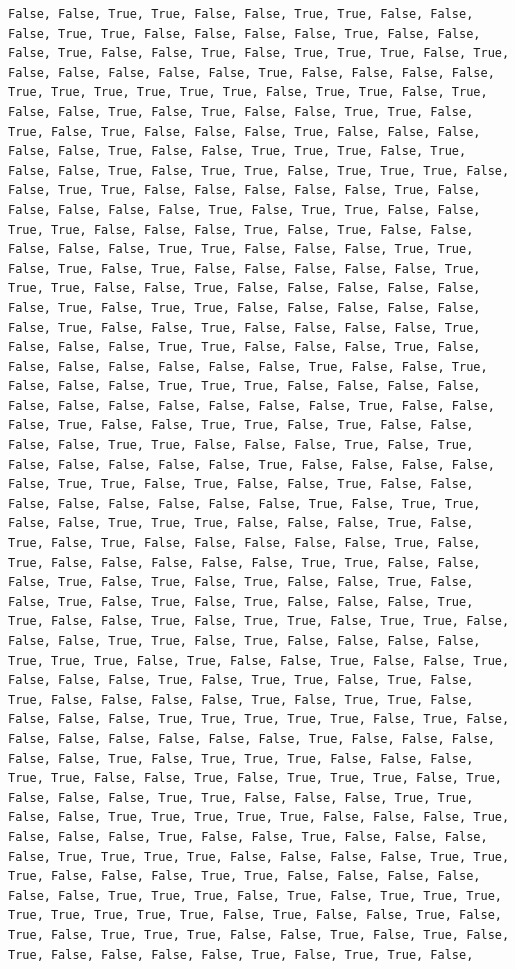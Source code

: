 \documentclass[
  letterpaper,
  DIV=11,
  numbers=noendperiod]{scrartcl}
\begin{document}
\begin{verbatim}
False, False, True, True, False, False, True, True, False, False, False, True, True, False, False, False, False, True, False, False, False, True, False, False, True, False, True, True, True, False, True, False, False, False, False, False, True, False, False, False, False, True, True, True, True, True, True, False, True, True, False, True, False, False, True, False, True, False, False, True, True, False, True, False, True, False, False, False, True, False, False, False, False, False, True, False, False, True, True, True, False, True, False, False, True, False, True, True, False, True, True, True, False, False, True, True, False, False, False, False, False, True, False, False, False, False, False, True, False, True, True, False, False, True, True, False, False, False, True, False, True, False, False, False, False, False, True, True, False, False, False, True, True, False, True, False, True, False, False, False, False, False, True, True, True, False, False, True, False, False, False, False, False, False, True, False, True, True, False, False, False, False, False, False, True, False, False, True, False, False, False, False, True, False, False, False, True, True, False, False, False, True, False, False, False, False, False, False, False, True, False, False, True, False, False, False, True, True, True, False, False, False, False, False, False, False, False, False, False, False, True, False, False, False, True, False, False, True, True, False, True, False, False, False, False, True, True, False, False, False, True, False, True, False, False, False, False, False, True, False, False, False, False, False, True, True, False, True, False, False, True, False, False, False, False, False, False, False, False, True, False, True, True, False, False, True, True, True, False, False, False, True, False, True, False, True, False, False, False, False, False, True, False, True, False, False, False, False, False, True, True, False, False, False, True, False, True, False, True, False, False, True, False, False, True, False, True, False, True, False, False, False, True, True, False, False, True, False, True, True, False, True, True, False, False, False, True, True, False, True, False, False, False, False, True, True, True, False, True, False, False, True, False, False, True, False, False, False, True, False, True, True, False, True, False, True, False, False, False, False, True, False, True, True, False, False, False, False, True, True, True, True, True, False, True, False, False, False, False, False, False, False, True, False, False, False, False, False, True, False, True, True, True, False, False, False, True, True, False, False, True, False, True, True, True, False, True, False, False, False, True, True, False, False, False, True, True, False, False, True, True, True, True, True, False, False, False, True, False, False, False, True, False, False, True, False, False, False, False, True, True, True, True, False, False, False, False, True, True, True, False, False, False, True, True, False, False, False, False, False, False, True, True, True, False, True, False, True, True, True, True, True, True, True, True, False, True, False, False, True, False, True, False, True, True, True, False, False, True, False, True, False, True, False, False, False, False, True, False, True, True, False, 
\end{verbatim}
\end{document}
